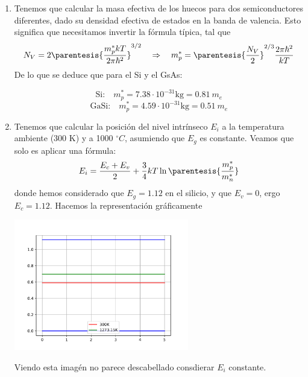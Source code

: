 
	\begin{enumerate}[label=\alph*)]
		\item	Tenemos que calcular la masa efectiva de los huecos para dos semiconductores diferentes, dado su densidad efectiva de estados en la banda de valencia. Esto significa que necesitamos invertir la fórmula típica, tal que
		\begin{equation}
			N_V = 2 \parentesis{\frac{m_p^* kT}{2\pi\hbar^2}}^{3/2} \quad \Rightarrow \quad m_p^* = \parentesis{\frac{N_V}{2}}^{2/3} {\frac{2 \pi \hbar^2}{kT}}
		\end{equation}
		De lo que se deduce que para el Si y el GsAs:

		\begin{equation}
			\text{Si:} \quad m_p^* = 7.38\cdot10^{-31} \text{kg} = 0.81 \ {m}_e
		\end{equation}
		\begin{equation}
			\text{GaSi:}\quad m_p^* = 4.59 \cdot10^{-31} \text{kg} = 0.51 \ {m}_e
		\end{equation}
		\item Tenemos que calcular la posición del nivel intrínseco $E_i$ a la temperatura ambiente (300 K) y a 1000 $^\circ C$, asumiendo que $E_g$ es constante. Veamos que solo es aplicar una fórmula:
		\begin{equation}
			E_i = \frac{E_c+E_v}{2} + \frac{3}{4} kT \ln\parentesis{\frac{m_p^*}{m_n^*}}
		\end{equation}
		donde hemos considerado que $E_g=1.12$ en el silicio, y que $E_v=0$, ergo $E_c=1.12$. Hacemos la representación gráficamente
		\begin{center}
			\includegraphics[width=0.6\textwidth]{Cuerpo/Ch_01/Ejercicio_01_5.pdf}
		\end{center}
		Viendo esta imagén no parece descabellado consdierar $E_i$ constante.
	\end{enumerate}
	
